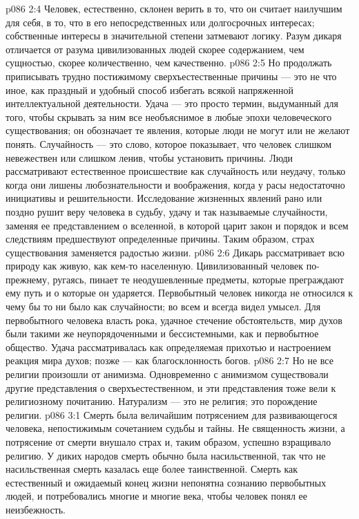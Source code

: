 \vs p086 2:4 \pc Человек, естественно, склонен верить в то, что он считает наилучшим для себя, в то, что в его непосредственных или долгосрочных интересах; собственные интересы в значительной степени затмевают логику. Разум дикаря отличается от разума цивилизованных людей скорее содержанием, чем сущностью, скорее количественно, чем качественно.
\vs p086 2:5 Но продолжать приписывать трудно постижимому сверхъестественные причины --- это не что иное, как праздный и удобный способ избегать всякой напряженной интеллектуальной деятельности. Удача --- это просто термин, выдуманный для того, чтобы скрывать за ним все необъяснимое в любые эпохи человеческого существования; он обозначает те явления, которые люди не могут или не желают понять. Случайность --- это слово, которое показывает, что человек слишком невежествен или слишком ленив, чтобы установить причины. Люди рассматривают естественное происшествие как случайность или неудачу, только когда они лишены любознательности и воображения, когда у расы недостаточно инициативы и решительности. Исследование жизненных явлений рано или поздно рушит веру человека в судьбу, удачу и так называемые случайности, заменяя ее представлением о вселенной, в которой царит закон и порядок и всем следствиям предшествуют определенные причины. Таким образом, страх существования заменяется радостью жизни.
\vs p086 2:6 Дикарь рассматривает всю природу как живую, как кем\hyp{}то населенную. Цивилизованный человек по\hyp{}прежнему, ругаясь, пинает те неодушевленные предметы, которые преграждают ему путь и о которые он ударяется. Первобытный человек никогда не относился к чему бы то ни было как случайности; во всем и всегда видел умысел. Для первобытного человека власть рока, удачное стечение обстоятельств, мир духов были такими же неупорядоченными и бессистемными, как и первобытное общество. Удача рассматривалась как определяемая прихотью и настроением реакция мира духов; позже --- как благосклонность богов.
\vs p086 2:7 Но не все религии произошли от анимизма. Одновременно с анимизмом существовали другие представления о сверхъестественном, и эти представления тоже вели к религиозному почитанию. Натурализм --- это не религия; это порождение религии.
\vs p086 3:1 Смерть была величайшим потрясением для развивающегося человека, непостижимым сочетанием судьбы и тайны. Не священность жизни, а потрясение от смерти внушало страх и, таким образом, успешно взращивало религию. У диких народов смерть обычно была насильственной, так что не насильственная смерть казалась еще более таинственной. Смерть как естественный и ожидаемый конец жизни непонятна сознанию первобытных людей, и потребовались многие и многие века, чтобы человек понял ее неизбежность.
